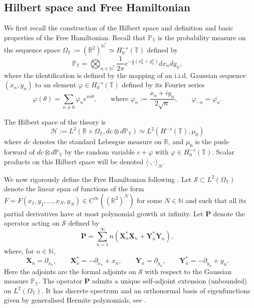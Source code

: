 \documentclass[11pt]{amsart}
\numberwithin{equation}{section}
\theoremstyle{definition}
\newcommand{\R}{\mathbb{R}}
\newcommand{\N}{\mathbb{N}}
\def\X{\mathbf{X}}
\def\Y{\mathbf{Y}}
\def\bP{\mathbf{P}}
\def\P{\mathbb{P}}
\newcommand{\mc}{\mathcal}
\def\T{\mathbb{T}}
\begin{document}
\subsection{Hilbert space and Free Hamiltonian}

We first recall the construction of the Hilbert space and definition and basic properties of the Free Hamiltonian. Recall that $\P_\T$
 is the probability measure on the sequence space $\Omega_\T := (\R^2)^{\N^*}\simeq H_0^{-s}(\mathbb{T})$ defined by
\begin{equation}
\P_\T
=
\bigotimes_{n \in \N^*} \frac{1}{2\pi} e^{-\frac 12(x_n^2 + y_n^2)} dx_n dy_n,
\end{equation}
where the identification is defined by the mapping of an i.i.d. Gaussian sequence $(x_n,y_n)$ to an element $\varphi \in H^{-s}_0(\mathbb{T})$ defined by its Fourier series
\begin{equation}\label{def_varphi}
\varphi(\theta)
=
\sum_{n \neq 0} \varphi_{n} e^{ i n \theta},  \qquad
\textrm{where } \varphi_{n} 
:= 
\frac{x_n + i y_n}{2 \sqrt n} , \qquad \varphi_{-n} = \overline{\varphi_{n}}.
\end{equation}

The Hilbert space of the theory is 
\[ \mc{H}:=L^2(\R\times \Omega_\T,dc\otimes d\P_\T)\simeq L^2(H^{-s}(\T),\mu_0)\]
 where $dc$ denotes the standard Lebesgue measure on $\mathbb{R}$, and
  $\mu_0$ is the push-forward of $dc\otimes d\P_\T$ by the random variable $c+\varphi$ with $\varphi\in H_0^{-s}(\T)$. Scalar products on this Hilbert space will be denoted $\langle \cdot, \cdot \rangle_{\mc{H}}$. 

We now rigorously define the Free Hamiltonian following \cite[Section 4]{GKRV}. Let $\mathcal{S} \subset L^2(\Omega_\T)$ denote the linear span of functions of the form $F = F(x_1,y_1, \dots, x_N,y_N) \in C^\infty((\R^2)^N)$ for some $N \in \N$ and such that all its partial derivatives have at most polynomial growth at infinity. Let $\bP$ denote the operator acting on $\mathcal{S}$ defined by
\begin{equation}
\bP
=
\sum_{n=1}^\infty n(\X_n^* \X_n + \Y_n^* \Y_n),	
\end{equation}
where, for $n \in \N$,  
\begin{equation}
\X_n = \partial_{x_n}, \qquad \X_n^* = - \partial_{x_n}+x_n, \qquad 
\Y_n = \partial_{y_n}, \qquad \Y_n^* = - \partial_{y_n} + y_n. 	
\end{equation}
Here the adjoints are the formal adjoints on $\mc{S}$ with respect to the Gaussian measure $\P_\T$. The operator $\bP$ admits a unique self-adjoint extension (unbounded) on $L^2(\Omega_\T)$. It has discrete spectrum and an orthonormal  basis of  eigenfunctions given by generalised Hermite polynomials, see \cite[Section 4.1]{GKRV}. 
\end{document}
